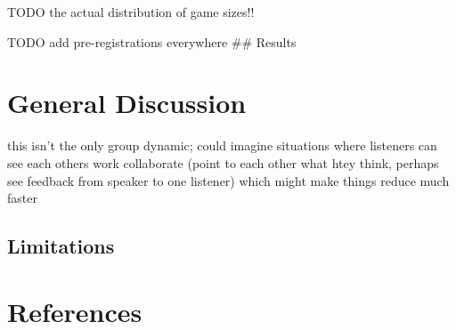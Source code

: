 \documentclass[
  english,
  a4paper,
]{article}
\begin{document}
TODO the actual distribution of game sizes!!

TODO add pre-registrations everywhere
\#\# Results

\hypertarget{general-discussion}{%
\section{General Discussion}\label{general-discussion}}

this isn't the only group dynamic; could imagine situations where listeners can see each others work collaborate (point to each other what htey think, perhaps see feedback from speaker to one listener) which might make things reduce much faster

\hypertarget{limitations}{%
\subsection{Limitations}\label{limitations}}

\hypertarget{references}{%
\section{References}\label{references}}

\setlength{\parindent}{-0.1in} 
\setlength{\leftskip}{0.125in}

\noindent
\end{document}
